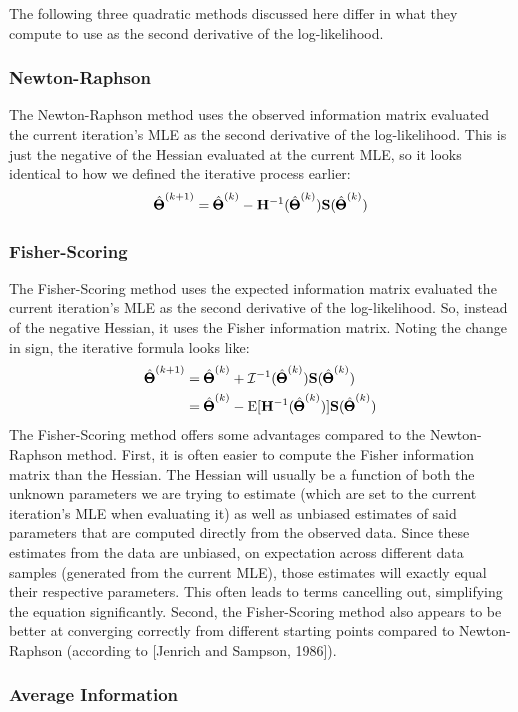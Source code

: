 \documentclass[12pt]{article}
\begin{document}
The following three quadratic methods discussed here differ in what they compute to use as the second derivative of the log-likelihood.

\subsubsection{Newton-Raphson}
The Newton-Raphson method uses the observed information matrix evaluated the current iteration's MLE as the second derivative of the log-likelihood.
This is just the negative of the Hessian evaluated at the current MLE, so it looks identical to how we defined the iterative process earlier:
$$
\hat{\pmb{\Theta}}^{(k+1)} = 
\hat{\pmb{\Theta}}^{(k)} -
\mathbf{H}^{-1} (\hat{\pmb{\Theta}}^{(k)})
\mathbf{S}(\hat{\pmb{\Theta}}^{(k)})
$$

\subsubsection{Fisher-Scoring}
The Fisher-Scoring method uses the expected information matrix evaluated the current iteration's MLE as the second derivative of the log-likelihood.
So, instead of the negative Hessian, it uses the Fisher information matrix.
Noting the change in sign, the iterative formula looks like:
\begin{align*}
\hat{\pmb{\Theta}}^{(k+1)} &= 
\hat{\pmb{\Theta}}^{(k)} +
\mathcal{I}^{-1} (\hat{\pmb{\Theta}}^{(k)})
\mathbf{S}(\hat{\pmb{\Theta}}^{(k)}) \\
&= 
\hat{\pmb{\Theta}}^{(k)} -
\mathrm{E}[\mathbf{H}^{-1} (\hat{\pmb{\Theta}}^{(k)})]
\mathbf{S}(\hat{\pmb{\Theta}}^{(k)})
\end{align*}
The Fisher-Scoring method offers some advantages compared to the Newton-Raphson method.
First, it is often easier to compute the Fisher information matrix than the Hessian.
The Hessian will usually be a function of both the unknown parameters we are trying to estimate (which are set to the current iteration's MLE when evaluating it) as well as unbiased estimates of said parameters that are computed directly from the observed data.
Since these estimates from the data are unbiased, on expectation across different data samples (generated from the current MLE), those estimates will exactly equal their respective parameters.
This often leads to terms cancelling out, simplifying the equation significantly.
Second, the Fisher-Scoring method also appears to be better at converging correctly from different starting points compared to Newton-Raphson (according to [Jenrich and Sampson, 1986]).

\subsubsection{Average Information}
\end{document}
